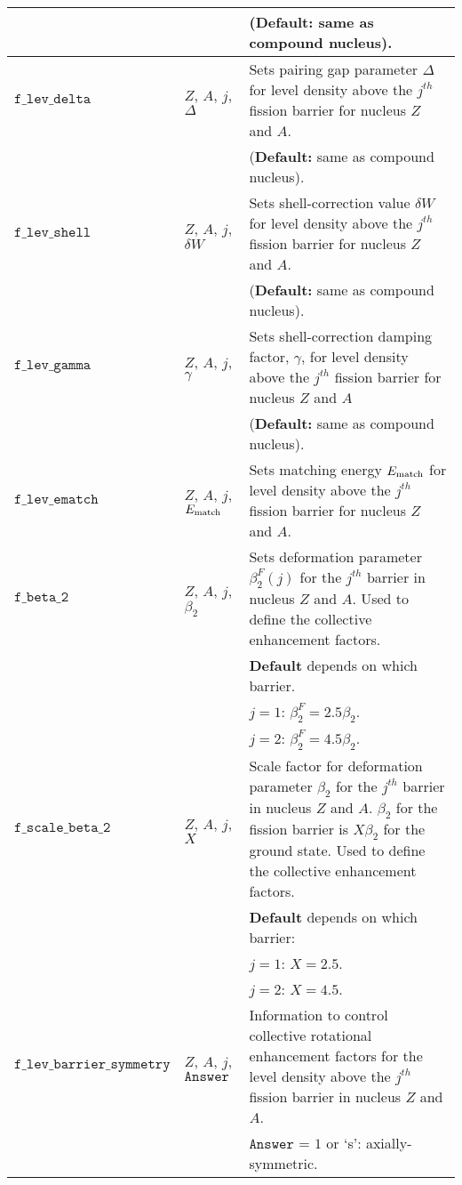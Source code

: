 \documentclass[
10pt,
showpacs,preprintnumbers,footinbib,
amsfonts,amsmath,amssymb,
aps,
prc,twocolumn,groupedaddress,superscriptaddress,
showkeys,
nofootinbib
]{revtex4-1}
\begin{document}
\begin{center}
\begin{tabular}{| p{4cm} | p{4cm} | p{9cm} |}
& & ({\bf Default:} same as compound nucleus).\\
\hline
${\texttt{f\_lev\_delta}}$  &  $Z$, $A$, $j$, $\Delta$   &  Sets pairing gap parameter $\Delta$ for level density above the $j^{th}$ fission barrier for nucleus $Z$ and $A$.\\
& & ({\bf Default:} same as compound nucleus).\\
\hline
${\texttt{f\_lev\_shell}}$   & $Z$, $A$, $j$, $\delta W$  & Sets shell-correction value $\delta W$ for level density above the $j^{th}$ fission barrier for nucleus $Z$ and $A$. \\
& & ({\bf Default:} same as compound nucleus).\\
\hline
${\texttt{f\_lev\_gamma}}$  &  $Z$, $A$, $j$, $\gamma$  &    Sets shell-correction damping factor, $\gamma$, for level density above the $j^{th}$ fission barrier for nucleus $Z$ and $A$\\
& & ({\bf Default:} same as compound nucleus).\\
\hline
${\texttt{f\_lev\_ematch}}$  &  $Z$, $A$, $j$, $E_{\rm match}$ &    Sets matching energy $E_{\rm match}$ for level density above the $j^{th}$ fission barrier for nucleus $Z$ and $A$.\\
\hline
${\texttt{f\_beta\_2}}$ & $Z$, $A$, $j$, $\beta_2$ & Sets deformation parameter $\beta_2^F(j)$ for the $j^{th}$ barrier in nucleus $Z$ and $A$. Used to define the collective enhancement factors.\\
& & {\bf Default} depends on which barrier. \\
& & $j = 1$:  $\beta_2^F = 2.5\beta_2$.\\
& & $j = 2$:  $\beta_2^F = 4.5\beta_2$.\\
\hline
${\texttt{f\_scale\_beta\_2}}$ & $Z$, $A$, $j$, $X$ & Scale factor for deformation parameter $\beta_2$ for the $j^{th}$ barrier in nucleus $Z$ and $A$. $\beta_2$ for the fission barrier is $X\beta_2$ for the ground state. Used to define the collective enhancement factors.\\
& & {\bf Default} depends on which barrier: \\
& & $j = 1$:  $X = 2.5$.\\
& & $j = 2$:  $X = 4.5$.\\
\hline
${\texttt{f\_lev\_barrier\_symmetry}}$   &  $Z$, $A$, $j$, ${\texttt{Answer}}$ & Information to control collective rotational enhancement factors for the level density above the $j^{th}$ fission barrier in nucleus $Z$ and $A$.\\
& & ${\texttt{Answer}}$  = $1$ or `s': axially-symmetric.\\

\end{tabular}
\end{center}
\end{document}
